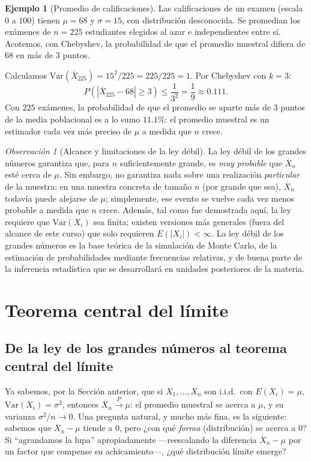 \documentclass[11pt,a4paper]{article}
\theoremstyle{plain}
\theoremstyle{definition}
\newtheorem{ejemplo}[teorema]{Ejemplo}
\theoremstyle{remark}
\newtheorem{observacion}[teorema]{Observación}
\begin{document}
\begin{ejemplo}[Promedio de calificaciones]
Las calificaciones de un examen (escala $0$ a $100$) tienen $\mu=68$ y $\sigma=15$, con distribución desconocida. Se promedian los exámenes de $n=225$ estudiantes elegidos al azar e independientes entre sí. Acotemos, con Chebyshev, la probabilidad de que el promedio muestral difiera de $68$ en más de $3$ puntos.

Calculamos $\text{Var}(\overline{X}_{225}) = 15^2/225 = 225/225 = 1$. Por Chebyshev con $k=3$:
\[
P(|\overline{X}_{225}-68|\geq3) \leq \frac{1}{3^2} = \frac19 \approx 0.111.
\]
Con $225$ exámenes, la probabilidad de que el promedio se aparte más de $3$ puntos de la media poblacional es a lo sumo $11.1\%$: el promedio muestral es un estimador cada vez más preciso de $\mu$ a medida que $n$ crece.
\end{ejemplo}

\begin{observacion}[Alcance y limitaciones de la ley débil]
La ley débil de los grandes números garantiza que, para $n$ suficientemente grande, es \emph{muy probable} que $\overline{X}_n$ esté cerca de $\mu$. Sin embargo, no garantiza nada sobre una realización \emph{particular} de la muestra: en una muestra concreta de tamaño $n$ (por grande que sea), $\overline{X}_n$ todavía puede alejarse de $\mu$; simplemente, ese evento se vuelve cada vez menos probable a medida que $n$ crece. Además, tal como fue demostrada aquí, la ley requiere que $\text{Var}(X_i)$ sea finita; existen versiones más generales (fuera del alcance de este curso) que solo requieren $E(|X_i|)<\infty$. La ley débil de los grandes números es la base teórica de la simulación de Monte Carlo, de la estimación de probabilidades mediante frecuencias relativas, y de buena parte de la inferencia estadística que se desarrollará en unidades posteriores de la materia.
\end{observacion}

\newpage
\section{Teorema central del límite}
\label{sec:tcl}

\subsection{De la ley de los grandes números al teorema central del límite}

Ya sabemos, por la Sección anterior, que si $X_1,\dots,X_n$ son i.i.d.\ con $E(X_i)=\mu$, $\text{Var}(X_i)=\sigma^2$, entonces $\overline{X}_n\xrightarrow{P}\mu$: el promedio muestral se acerca a $\mu$, y su varianza $\sigma^2/n\to0$. Una pregunta natural, y mucho más fina, es la siguiente: sabemos que $\overline{X}_n-\mu$ tiende a $0$, pero ¿con qué \emph{forma} (distribución) se acerca a $0$? Si ``agrandamos la lupa'' apropiadamente —reescalando la diferencia $\overline{X}_n-\mu$ por un factor que compense su achicamiento—, ¿qué distribución límite emerge?
\end{document}
